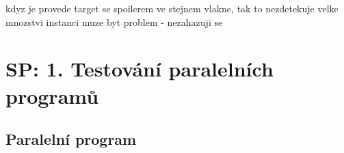 kdyz je provede target se spoilerem ve stejnem vlakne, tak to nezdetekuje
velke mnozstvi instanci muze byt problem - nezahazuji se

\chapter{SP: 1. Testování paralelních programů}



\section{Paralelní program}\label{paralel-program}


